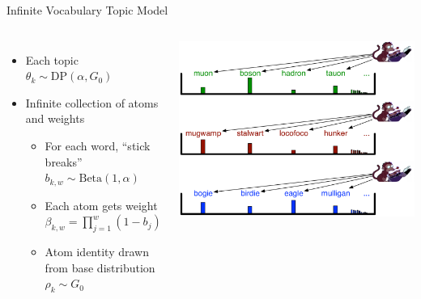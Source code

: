 \documentclass[compress]{beamer}
\begin{document}

\begin{frame}{Infinite Vocabulary Topic Model}

  \begin{columns}
     \begin{itemize}
       \item Each topic $\theta_k \sim \mbox{DP}(\alpha, G_0)$
       \item Infinite collection of atoms and weights
     \begin{itemize}
       \item For each word, ``stick breaks'' \alert<2>{$b_{k, w} \sim \mbox{Beta}(1,\alpha)$}
       \item Each atom gets weight \alert<3>{$\beta_{k, w} = \prod_{j=1}^{w} (1 - b_j)$}
       \item Atom identity drawn from base distribution $\rho_k \sim G_0$
     \end{itemize}
     \end{itemize}
       \includegraphics[width=1.0\linewidth]{infvoc/dp_monkey-topics}
  \end{columns}

\end{frame}

\end{document}
